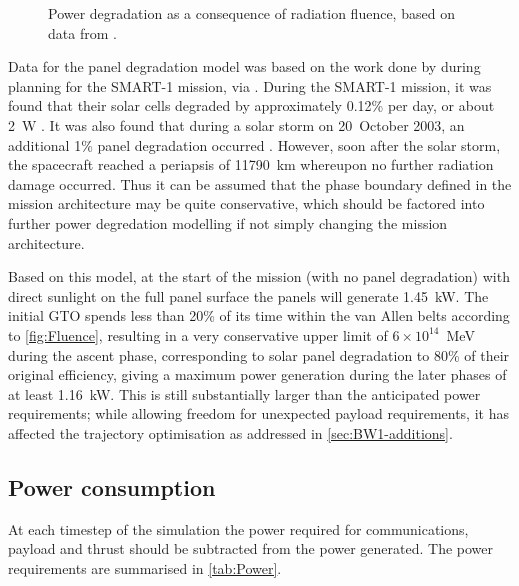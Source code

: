 \begin{figure}
\centering
\def\svgwidth{\figurewidth}

\caption{Power degradation as a consequence of radiation fluence, based on data from \textcite{Erb_thesis}.} \label{fig:Fluence2}
\end{figure}

Data for the panel degradation model was based on the work done by \textcite{Hechler2002} during planning for the SMART-1 mission, via \textcite{Erb_thesis}. During the SMART-1 mission, it was found that their solar cells degraded by approximately 0.12\% per day, or about 2~W \parencite{Racca5}. It was also found that during a solar storm on 20~October 2003, an additional 1\% panel degradation occurred \parencite{Racca8}. However, soon after the solar storm, the spacecraft reached a periapsis of 11790~km whereupon no further radiation damage occurred. Thus it can be assumed that the phase boundary defined in the mission architecture may be quite conservative, which should be factored into further power degredation modelling if not simply changing the mission architecture.


Based on this model, at the start of the mission (with no panel degradation) with direct sunlight on the full panel surface the panels will generate 1.45~kW. The initial GTO spends less than 20\% of its time within the van Allen belts according to \autoref{fig:Fluence}, resulting in a very conservative upper limit of $6\times10^{14}$~MeV during the ascent phase, corresponding to solar panel degradation to 80\% of their original efficiency, giving a maximum power generation during the later phases of at least 1.16~kW. This is still substantially larger than the anticipated power requirements; while allowing freedom for unexpected payload requirements, it has affected the trajectory optimisation as addressed in \autoref{sec:BW1-additions}. 

\subsection{Power consumption} \label{sub:Power-consumption}

At each timestep of the simulation the power required for communications, payload and thrust should be subtracted from the power generated. The power requirements are summarised in \autoref{tab:Power}.

